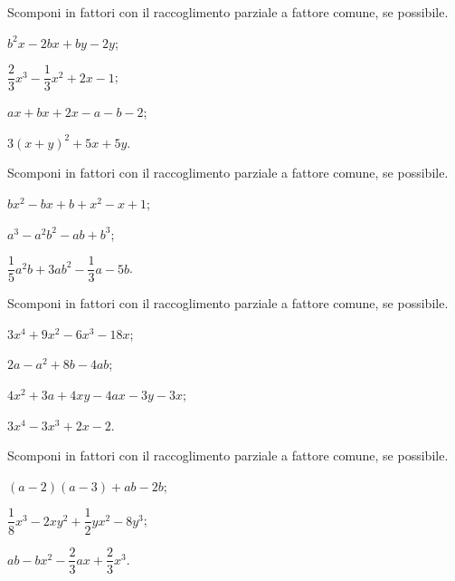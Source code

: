 \begin{esercizio}
\label{ese:13.25}
Scomponi in fattori con il raccoglimento parziale a fattore comune, se possibile.
\begin{multicols}{2}
\begin{enumeratea}
 \item $b^{2}x-2bx+by-2y$;
 \item $\dfrac{2}{3}x^{3}-\dfrac{1}{3}x^{2}+2x-1$;
 \item $ax+bx+2x-a-b-2$;
 \item $3(x+y)^{2}+5x+5y$.
\end{enumeratea}
\end{multicols}
\end{esercizio}
\pagebreak
\begin{esercizio}[\Ast]
\label{ese:13.26}
Scomponi in fattori con il raccoglimento parziale a fattore comune, se possibile.
\begin{multicols}{2}
\begin{enumeratea}
 \item $bx^{2}-bx+b+x^{2}-x+1$;
 \item $a^{3}-a^{2}b^{2}-ab+b^{3}$;
 \item $\dfrac{1}{5}a^{2}b+3ab^{2}-\dfrac{1}{3}a-5b$.
\end{enumeratea}
\end{multicols}
\end{esercizio}

\begin{esercizio}
\label{ese:13.27}
Scomponi in fattori con il raccoglimento parziale a fattore comune, se possibile.
\begin{multicols}{2}
\begin{enumeratea}
 \item $3x^{4}+9x^{2}-6x^{3}-18x$;
 \item $2a-a^{2}+8b-4ab$;
 \item $4x^{2}+3a+4xy-4ax-3y-3x$;
 \item $3x^{4}-3x^{3}+2x-2$.
\end{enumeratea}
\end{multicols}
\end{esercizio}

\begin{esercizio}[\Ast]
\label{ese:13.28}
Scomponi in fattori con il raccoglimento parziale a fattore comune, se possibile.
\begin{multicols}{2}
 \begin{enumeratea}
 \item $(a-2)(a-3)+ab-2b$;
 \item $\dfrac{1}{8}x^{3}-2xy^{2}+\dfrac{1}{2}yx^{2}-8y^{3}$;
 \item $ab-bx^{2}-\dfrac{2}{3}ax+\dfrac{2}{3}x^{3}$.
\end{enumeratea}
\end{multicols}
\end{esercizio}

